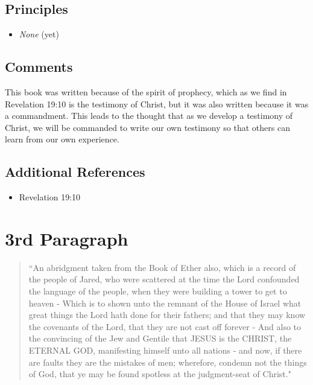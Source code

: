 \documentclass[12pt]{report}
\begin{document}
\subsection{Principles\label{titlePage:principles2}}
\begin{itemize}
\item \emph{None} (yet)
\end{itemize}

\subsection{Comments\label{titlePage:comments2}}
This book was written because of the spirit of prophecy, which as we find in Revelation 19:10 is the testimony of Christ, but it was also written because it was a commandment.  This leads to the thought that as we develop a testimony of Christ, we will be commanded to write our own testimony so that others can learn from our own experience.

\subsection{Additional References\label{titlePage:references2}}
\begin{itemize}
\item Revelation 19:10
\end{itemize}

\section{3rd Paragraph\label{titlePage:3rd}}
\begin{center}
\begin{quote}
``An abridgment taken from the Book of Ether also, which is a record of the people of Jared, who were scattered at the time the Lord confounded the language of the people, when they were building a tower to get to heaven - Which is to shown unto the remnant of the House of Israel what great things the Lord hath done for their fathers; and that they may know the covenants of the Lord, that they are not cast off forever - And also to the convincing of the Jew and Gentile that JESUS is the CHRIST, the ETERNAL GOD, manifesting himself unto all nations - and now, if there are faults they are the mistakes of men; wherefore, condemn not the things of God, that ye may be found spotless at the judgment-seat of Christ."
\end{quote}
\end{center}
\end{document}
